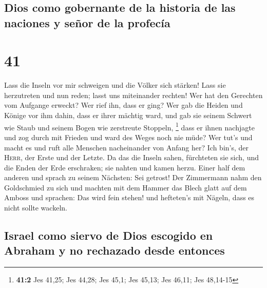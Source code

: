 \hypertarget{dios-como-gobernante-de-la-historia-de-las-naciones-y-seuxf1or-de-la-profecuxeda}{%
\subsection{Dios como gobernante de la historia de las naciones y señor
de la
profecía}\label{dios-como-gobernante-de-la-historia-de-las-naciones-y-seuxf1or-de-la-profecuxeda}}

\hypertarget{section-40}{%
\section{41}\label{section-40}}

 Lass die Inseln vor mir schweigen und die Völker sich
stärken! Lass sie herzutreten und nun reden; lasst uns miteinander
rechten!  Wer hat den Gerechten vom Aufgange erweckt? Wer
rief ihn, dass er ging? Wer gab die Heiden und Könige vor ihm dahin,
dass er ihrer mächtig ward, und gab sie seinem Schwert wie Staub und
seinem Bogen wie zerstreute Stoppeln, \footnote{\textbf{41:2} Jes 41,25;
  Jes 44,28; Jes 45,1; Jes 45,13; Jes 46,11; Jes 48,14-15}
 dass er ihnen nachjagte und zog durch mit Frieden und
ward des Weges noch nie müde?  Wer tut's und macht es und
ruft alle Menschen nacheinander von Anfang her? Ich bin's, der
\textsc{Herr}, der Erste und der Letzte.  Da das die
Inseln sahen, fürchteten sie sich, und die Enden der Erde erschraken;
sie nahten und kamen herzu.  Einer half dem anderen und
sprach zu seinem Nächsten: Sei getrost!  Der Zimmermann
nahm den Goldschmied zu sich und machten mit dem Hammer das Blech glatt
auf dem Amboss und sprachen: Das wird fein stehen! und hefteten's mit
Nägeln, dass es nicht sollte wackeln.

\hypertarget{israel-como-siervo-de-dios-escogido-en-abraham-y-no-rechazado-desde-entonces}{%
\subsection{Israel como siervo de Dios escogido en Abraham y no
rechazado desde
entonces}\label{israel-como-siervo-de-dios-escogido-en-abraham-y-no-rechazado-desde-entonces}}

